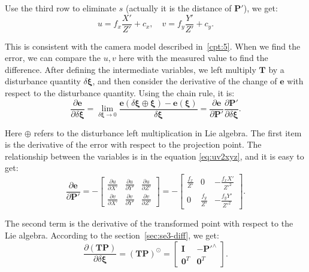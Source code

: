 Use the third row to eliminate $s$ (actually it is the distance of $\mathbf{P}'$), we get:
\begin{equation}
\label{eq:uv2xyz}
u = {f_x}\frac{{X'}}{{Z'}} + {c_x}, \quad v = {f_y}\frac{{Y'}}{{Z'}} + {c_y}.
\end{equation}

This is consistent with the camera model described in~\ref{cpt:5}. When we find the error, we can compare the $u, v$ here with the measured value to find the difference. After defining the intermediate variables, we left multiply $\mathbf{T}$ by a disturbance quantity $\delta \boldsymbol{\xi}$, and then consider the derivative of the change of $\mathbf{e}$ with respect to the disturbance quantity. Using the chain rule, it is:
\begin{equation}
\frac{{\partial \mathbf{e}}}{{\partial \delta \boldsymbol{\xi} }} = \mathop {\lim }\limits_{\delta \boldsymbol{\xi}  \to 0} \frac{{\mathbf{e}\left( {\delta \boldsymbol{\xi}  \oplus \boldsymbol{\xi} } \right)-\mathbf{e}(\boldsymbol{\xi})}}{{\delta \boldsymbol{\xi} }}  = \frac{{\partial \mathbf{e}}}{{\partial \mathbf{P}'}}\frac{{\partial \mathbf{P}'}}{{\partial \delta \boldsymbol{\xi} }}.
\end{equation}

Here $\oplus$ refers to the disturbance left multiplication in Lie algebra. The first item is the derivative of the error with respect to the projection point. The relationship between the variables is in the equation \eqref{eq:uv2xyz}, and it is easy to get:
\begin{equation}
\frac{{\partial \mathbf{e}}}{{\partial \mathbf{P}'}} = -\left[ 
{\begin{array}{*{20}{c}}
	{\frac{{\partial u}}{{\partial X'}}}&{\frac{{\partial u}}{{\partial Y'}}}&{\frac{{\partial u}}{{\partial Z'}}}\\
	{\frac{{\partial v}}{{\partial X'}}}&{\frac{{\partial v}}{{\partial Y'}}}&{\frac{{\partial v}}{{\partial Z'}}}
	\end{array}} \right] 
= - \left[ {\begin{array}{*{20}{c}}
	{\frac{{{f_x}}}{Z'}}&0&{ - \frac{{{f_x}X'}}{{{Z'^2}}}}\\
	0&{\frac{{{f_y}}}{Z'}}&{ - \frac{{{f_y}Y'}}{Z'^2}}
\end{array}} \right].
\end{equation}

The second term is the derivative of the transformed point with respect to the Lie algebra. According to the section~\ref{sec:se3-diff}, we get:
\begin{equation}
\frac{{\partial \left( \mathbf{TP} \right)}}{{\partial \delta \boldsymbol{\xi} }} = {\left( \mathbf{TP} \right)^ \odot } = \left[ 
\begin{array}{*{20}{cc}}
\mathbf{I} &- \mathbf{P}'^ \wedge \\
\mathbf{0}^T &\mathbf{0}^T 
\end{array}
\right].
\end{equation}

